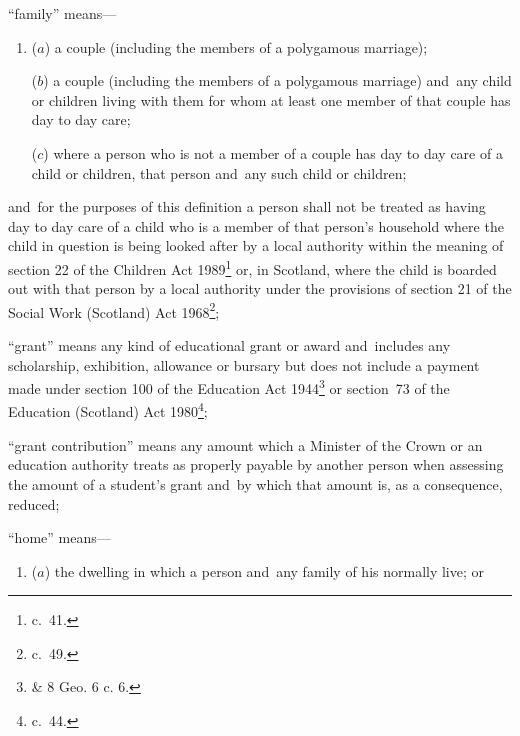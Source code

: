\documentclass[12pt,a4paper]{article}
\begin{document}
\begin{enumerate}
“family” means—
\begin{enumerate}\item[]
($a$) 
a couple  %
(including the members of a polygamous marriage);

($b$) 
a couple  %
(including the members of a polygamous marriage) and~any child or children living with them for whom at least one member of that couple has day to day care;

($c$) where a person who is not a member of 
a couple  %
has day to day care of a child or children, that person and~any such child or children;
\end{enumerate}
and~for the purposes of this definition a person shall not be treated as having day to day care of a child who is a member of that person’s household where the child in question is being looked after by a local authority within the meaning of section 22 of the Children Act 1989\footnote{ c.~41.} or, in Scotland, where the child is boarded out with that person by a local authority under the provisions of section 21 of the Social Work (Scotland) Act 1968\footnote{ c.~49.};


“grant” means any kind of educational grant or award and~includes any scholarship, exhibition, allowance or bursary but does not include a payment made under section 100 of the Education Act 1944\footnote{ \& 8 Geo. 6 c. 6.} or section~73 of the Education (Scotland) Act 1980\footnote{ c.~44.};

“grant contribution” means any amount which a Minister of the Crown or an education authority treats as properly payable by another person when assessing the amount of a student’s grant and~by which that amount is, as a consequence, reduced;

“home” means—
\begin{enumerate}\item[]
($a$)
the dwelling in which a person and~any family of his normally live; or


\end{enumerate}
\end{enumerate}
\end{document}
